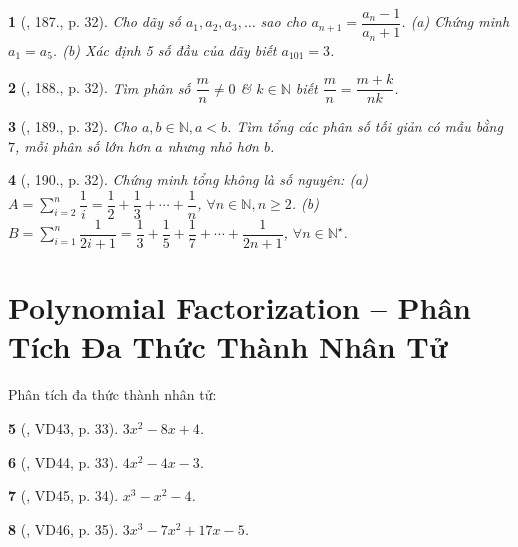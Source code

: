 \documentclass{article}
\newtheorem{baitoan}{}
\begin{document}
\begin{baitoan}[\cite{Binh_Toan_8_tap_1}, 187., p. 32]
	Cho dãy số $a_1,a_2,a_3,\ldots$ sao cho $a_{n+1} = \dfrac{a_n - 1}{a_n + 1}$. (a) Chứng minh $a_1 = a_5$. (b) Xác định 5 số đầu của dãy biết $a_{101} = 3$.
\end{baitoan}

\begin{baitoan}[\cite{Binh_Toan_8_tap_1}, 188., p. 32]
	Tìm phân số $\dfrac{m}{n}\ne0$ \& $k\in\mathbb{N}$ biết $\dfrac{m}{n} = \dfrac{m + k}{nk}$.
\end{baitoan}

\begin{baitoan}[\cite{Binh_Toan_8_tap_1}, 189., p. 32]
	Cho $a,b\in\mathbb{N},a < b$. Tìm tổng các phân số tối giản có mẫu bằng $7$, mỗi phân số lớn hơn $a$ nhưng nhỏ hơn $b$.
\end{baitoan}

\begin{baitoan}[\cite{Binh_Toan_8_tap_1}, 190., p. 32]
	Chứng minh tổng không là số nguyên: (a) $A = \sum_{i=2}^n \dfrac{1}{i} = \dfrac{1}{2} + \dfrac{1}{3} + \cdots + \dfrac{1}{n}$, $\forall n\in\mathbb{N},n\ge2$. (b) $B = \sum_{i=1}^n \dfrac{1}{2i + 1} = \dfrac{1}{3} + \dfrac{1}{5} + \dfrac{1}{7} + \cdots + \dfrac{1}{2n + 1}$, $\forall n\in\mathbb{N}^\star$.
\end{baitoan}


\section{Polynomial Factorization -- Phân Tích Đa Thức Thành Nhân Tử}
Phân tích đa thức thành nhân tử:

\begin{baitoan}[\cite{Binh_Toan_8_tap_1}, VD43, p. 33]
	$3x^2 - 8x + 4$.
\end{baitoan}

\begin{baitoan}[\cite{Binh_Toan_8_tap_1}, VD44, p. 33]
	$4x^2 - 4x - 3$.
\end{baitoan}

\begin{baitoan}[\cite{Binh_Toan_8_tap_1}, VD45, p. 34]
	$x^3 - x^2 - 4$.
\end{baitoan}

\begin{baitoan}[\cite{Binh_Toan_8_tap_1}, VD46, p. 35]
	$3x^3 - 7x^2 + 17x - 5$.
\end{baitoan}
\end{document}
